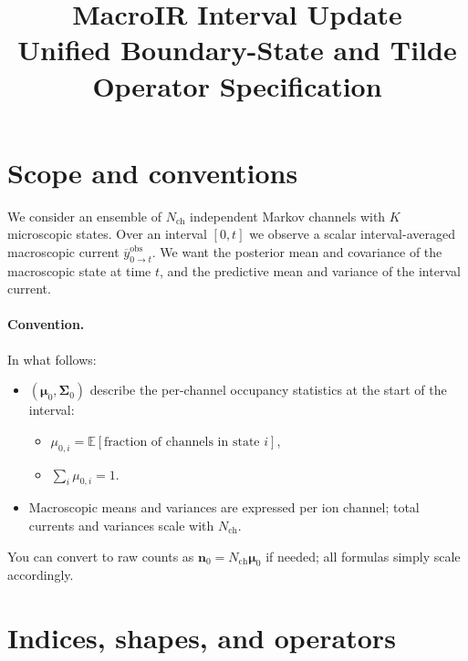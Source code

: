 \documentclass[11pt]{article}
\title{MacroIR Interval Update\\[4pt]
Unified Boundary-State and Tilde Operator Specification}
\author{}
\date{}
\begin{document}
\maketitle

\setcounter{section}{-1}

\section{Scope and conventions}

We consider an ensemble of \(N_{\text{ch}}\) independent Markov channels with \(K\) microscopic states. Over an interval \([0,t]\) we observe a scalar interval-averaged macroscopic current \(\overline{y}_{0\to t}^{\text{obs}}\). We want the posterior mean and covariance of the macroscopic state at time \(t\), and the predictive mean and variance of the interval current.

\paragraph{Convention.} In what follows:
\begin{itemize}
  \item \((\boldsymbol{\mu}_0, \boldsymbol{\Sigma}_0)\) describe the per-channel occupancy statistics at the start of the interval:
    \begin{itemize}
      \item \(\mu_{0,i} = \mathbb{E}[\text{fraction of channels in state } i]\),
      \item \(\sum_i \mu_{0,i} = 1\).
    \end{itemize}
  \item Macroscopic means and variances are expressed per ion channel; total currents and variances scale with \(N_{\text{ch}}\).
\end{itemize}

You can convert to raw counts as \(\boldsymbol{n}_0 = N_{\text{ch}}\boldsymbol{\mu}_0\) if needed; all formulas simply scale accordingly.

\section{Indices, shapes, and operators}
\end{document}

